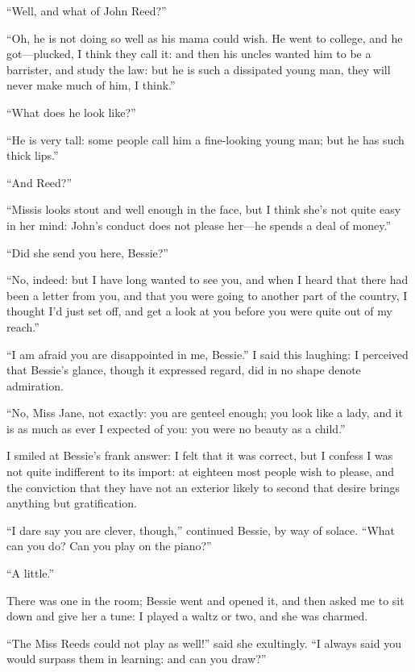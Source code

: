 \enquote{Well, and what of John Reed?}

\enquote{Oh, he is not doing so well as his mama could wish. He went to
	college, and he got---plucked, I think they call it: and then his uncles
	wanted him to be a barrister, and study the law: but he is such a
	dissipated young man, they will never make much of him, I think.}

\enquote{What does he look like?}

\enquote{He is very tall: some people call him a fine-looking young man;
	but he has such thick lips.}

\enquote{And \Mrs{} Reed?}

\enquote{Missis looks stout and well enough in the face, but I think
	she's not quite easy in her mind: \Mr{} John's conduct does not please
	her---he spends a deal of money.}

\enquote{Did she send you here, Bessie?}

\enquote{No, indeed: but I have long wanted to see you, and when I heard
	that there had been a letter from you, and that you were going to
	another part of the country, I thought I'd just set off, and get a look
	at you before you were quite out of my reach.}

\enquote{I am afraid you are disappointed in me, Bessie.} I said this
laughing: I perceived that Bessie's glance, though it expressed regard,
did in no shape denote admiration.

\enquote{No, Miss Jane, not exactly: you are genteel enough; you look
	like a lady, and it is as much as ever I expected of you: you were no
	beauty as a child.}

I smiled at Bessie's frank answer: I felt that it was correct, but I
confess I was not quite indifferent to its import: at eighteen most
people wish to please, and the conviction that they have not an exterior
likely to second that desire brings anything but gratification.

\enquote{I dare say you are clever, though,} continued Bessie, by way of
solace. \enquote{What can you do? Can you play on the piano?}

\enquote{A little.}

There was one in the room; Bessie went and opened it, and then asked me
to sit down and give her a tune: I played a waltz or two, and she was
charmed.

\enquote{The Miss Reeds could not play as well!} said she exultingly.
\enquote{I always said you would surpass them in learning: and can you
	draw?}


